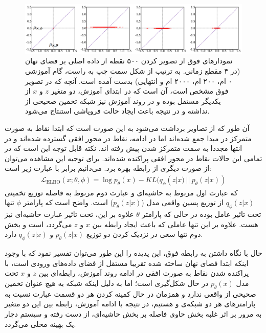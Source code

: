 \begin{figure}[H]
	\centering
	\includegraphics[width=1.\textwidth]{images/lagging2.png}
	\caption{
		نمودارهای فوق از تصویر کردن ۵۰۰ نقطه از داده اصلی بر فضای نهان (در ۴ مقطع زمانی. به ترتیب از شکل سمت چپ به راست، گام آموزشی ۰ ام، ۲۰۰ ام، ۲۰۰۰ ام و انتهایی) بدست آمده است. آنچه که در تصویر فوق مشخص است، آن است که در ابتدای آموزش، دو متغیر $z$ و $x$ از یکدیگر مستقل بوده و در روند آموزش نیز شبکه \encoder{} تخمین صحیحی از \posteriordist{} نداشته و در نتیجه باعث ایجاد حالت فروپاشی استنتاج می‌شود.
	}
\end{figure}
آن طور که از تصاویر برداشت می‌شود به این صورت است که ابتدا نقاط به صورت متمرکز در مبدا جمع شده‌اند  اما در ادامه، نقاط در محور افقی گسترده شده‌اند و در انتها مجددا به سمت متمرکز شدن پیش رفته اند. نکته قابل توجه این است که در تمامی این حالات نقاط در محور افقی پراکنده شده‌اند. برای توجیه این مشاهده می‌توان از صورت دیگری از رابطه  بهره برد. می‌دانیم  برابر با عبارت زیر است:
\begin{gather}
	\mathcal{L}_{\text{ELBO}}(x;\theta, \phi) = \log p_\theta(x) - {KL}(q_\phi(z|x)~||~ p_\theta(z|x))
\end{gather}
که عبارت اول مربوط به \likelihood{} حاشیه‌ای و عبارت دوم مربوط به فاصله توزیع تخمینی $q_\phi(z|x)$ از توزیع پسین واقعی مدل ($p_\theta(z|x)$) است. واضح است که پارامتر $\phi$ تنها تحت تاثیر عامل  بوده در حالی که پارامتر $\theta$ علاوه بر این، تحت تاثیر عبارت \likelihood{} حاشیه‌ای نیز هست. علاوه بر این تنها عاملی که باعث ایجاد رابطه بین $x$ و $z$ می‌گردد،
\likelihood{}
است و بخش دوم تنها سعی در نزدیک کردن دو توزیع $p_\theta(z|x)$ و $q_\phi(z|x)$ دارد.

حال با نگاه داشتن به رابطه فوق، این پدیده را این طور می‌توان تفسیر نمود که با وجود اینکه ابتدا فضای نهان ساخته شده تقریبا مستقل از فضای داده‌های ورودی است، با پراکنده شدن نقاط به صورت افقی در ادامه روند آموزش، رابطه‌ای بین $z$ و $x$ تحت مدل $p_\theta(x)$ در حال شکل‌گیری است؛ اما به دلیل اینکه شبکه \encoder{} به هیچ عنوان تخمین صحیحی از \posteriordist{} واقعی ندارد و همزمان در حال کمینه کردن هر دو قسمت عبارت  نسبت به پارامترهای هر دو شبکه‌ی \encoder{} و \decoder{} هستیم، در نتیجه با ادامه آموزش، رابطه بین این دو متغیر به مرور بر اثر غلبه بخش حاوی فاصله  بر بخش \likelihood{} حاشیه‌ای، از دست رفته و سیستم دچار یک بهینه محلی می‌گردد.


